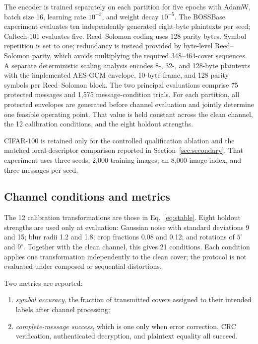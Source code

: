 ﻿\documentclass[a4paper,fleqn]{cas-dc}
\begin{document}
The encoder is trained separately on each partition for five epochs with
AdamW, batch size 16, learning rate $10^{-3}$, and weight decay $10^{-5}$.
The BOSSBase experiment evaluates ten independently generated eight-byte
plaintexts per seed; Caltech-101 evaluates five. Reed--Solomon coding uses 128
parity bytes. Symbol repetition is set to one; redundancy is instead provided
by byte-level Reed--Solomon parity, which avoids multiplying the required
348--464-cover sequences. A separate deterministic scaling analysis encodes
8-, 32-, and 128-byte plaintexts with the implemented AES-GCM envelope,
10-byte frame, and 128 parity symbols per Reed--Solomon block. The two
principal evaluations comprise 75 protected messages and 1,575
message-condition trials. For each partition, all protected envelopes are
generated before channel evaluation and jointly determine one feasible
operating point. That value is held constant across the clean channel, the
12 calibration conditions, and the eight holdout strengths.

CIFAR-100 \cite{krizhevsky2009cifar} is retained only for the controlled
qualification ablation and the matched local-descriptor comparison reported
in Section~\ref{sec:secondary}. That experiment uses three seeds, 2,000
training images, an 8,000-image index, and three messages per seed.

\subsection{Channel conditions and metrics}

The 12 calibration transformations are those in
Eq.~\eqref{eq:stable}. Eight holdout strengths are used only at evaluation:
Gaussian noise with standard deviations 9 and 15; blur radii 1.2 and 1.8;
crop fractions 0.08 and 0.12; and rotations of $5^\circ$ and $9^\circ$.
Together with the clean channel, this gives 21 conditions.
Each condition applies one transformation independently to the clean cover;
the protocol is not evaluated under composed or sequential distortions.

Two metrics are reported:
\begin{enumerate}
\item \emph{symbol accuracy}, the fraction of transmitted covers assigned to
their intended labels after channel processing;
\item \emph{complete-message success}, which is one only when error correction,
CRC verification, authenticated decryption, and plaintext equality all
succeed.
\end{enumerate}
\end{document}
